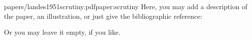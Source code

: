 
\begin{paper}{papers/landes1951scrutiny.pdf}{paper:scrutiny}
    Here, you may add a description of the paper, an illustration, or just give the bibliographic reference:
    \begin{quote}
    \end{quote}
    Or you may leave it empty, if you like.
\end{paper}

